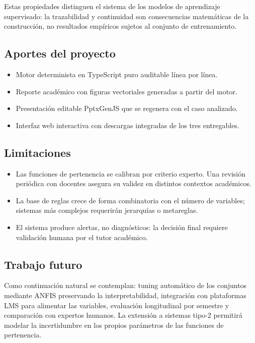 Estas propiedades distinguen el sistema de los modelos de aprendizaje supervisado: la trazabilidad y continuidad son consecuencias matemáticas de la construcción, no resultados empíricos sujetos al conjunto de entrenamiento.

\subsection{Aportes del proyecto}

\begin{itemize}
  \item Motor determinista en TypeScript puro auditable línea por línea.
  \item Reporte académico con figuras vectoriales generadas a partir del motor.
  \item Presentación editable PptxGenJS que se regenera con el caso analizado.
  \item Interfaz web interactiva con descargas integradas de los tres entregables.
\end{itemize}

\subsection{Limitaciones}

\begin{itemize}
  \item Las funciones de pertenencia se calibran por criterio experto. Una revisión periódica con docentes asegura su validez en distintos contextos académicos.
  \item La base de reglas crece de forma combinatoria con el número de variables; sistemas más complejos requerirán jerarquías o metareglas.
  \item El sistema produce alertas, no diagnósticos: la decisión final requiere validación humana por el tutor académico.
\end{itemize}

\subsection{Trabajo futuro}

Como continuación natural se contemplan: tuning automático de los conjuntos mediante ANFIS preservando la interpretabilidad, integración con plataformas LMS para alimentar las variables, evaluación longitudinal por semestre y comparación con expertos humanos. La extensión a sistemas tipo-2 \citep{castillo2008type2} permitirá modelar la incertidumbre en los propios parámetros de las funciones de pertenencia.

